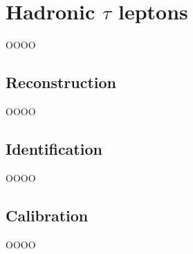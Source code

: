 \section{Hadronic \texorpdfstring{$\tau$}{tau} leptons}
\label{heading:Chapter6-section9-1}

OOOO

\subsection{Reconstruction}
\label{heading:Chapter6-section9-2}

OOOO

\subsection{Identification}
\label{heading:Chapter6-section9-3}

OOOO

\subsection{Calibration}
\label{heading:Chapter6-section9-4}

OOOO

